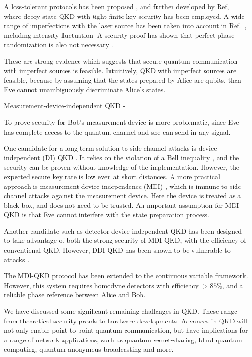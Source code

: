 A loss-tolerant protocols has been proposed \cite{PhysRevA.90.052314}, and further developed by Ref\cite{PhysRevA.92.032305}, where
decoy-state QKD with tight finite-key security has been employed. A wide range of imperfections with the laser source has been taken into account in Ref.~\cite{mizutani2015finite}, including intensity fluctuation.  A security proof has shown that perfect phase randomization is also not necessary \cite{cao2015discrete}.


These are strong evidence which suggests that secure quantum communication with imperfect sources is feasible\cite{diamanti2016practical}. Intuitively, QKD with imperfect sources are feasible, because by assuming that the states prepared by Alice are qubits, then Eve cannot unambiguously discriminate Alice's states\cite{diamanti2016practical}. 



Measurement-device-independent QKD -

To prove security for Bob's measurement device is more problematic, since Eve has complete access to the quantum channel and she can send in any signal. 

One candidate for a long-term solution to side-channel attacks is device-independent (DI) QKD \cite{PhysRevLett.98.230501}. It relies on the violation of a Bell inequality \cite{hensen2015loophole}, and the security can be proven without knowledge of the implementation. However, the expected secure key rate is low even at short distances. A more practical approach is measurement-device independence (MDI) \cite{PhysRevLett.108.130503}, which is immune to side-channel attacks against the measurement device. Here the device is treated as a black box, and does not need to be trusted. An important assumption for MDI QKD is that Eve cannot interfere with the state preparation process. 

Another candidate such as 
detector-device-independent \cite{lim2014detector,PhysRevA.92.022337} QKD has been designed to take advantage of both the strong security of MDI-QKD, with the efficiency of conventional QKD. However, DDI-QKD has been shown to be vulnerable to attacks \cite{PhysRevLett.117.250505}. 

The MDI-QKD protocol has been extended to the continuous variable framework. However, this system requires homodyne detectors with efficiency $> 85\%$, and a reliable phase reference between Alice and Bob.  



We have discussed some significant remaining challenges in QKD.
These range from theoretical security proofs to hardware developments.
Advances in QKD will not only enable point-to-point quantum communication,
but have implications for a range of network applications, such as
quantum secret-sharing\cite{cleve1999share,PhysRevA.61.042311,PhysRevA.71.044301}, blind quantum computing\cite{broadbent2009universal,barz2012demonstration}, quantum anonymous
broadcasting\cite{christandl2005quantum} and more.

